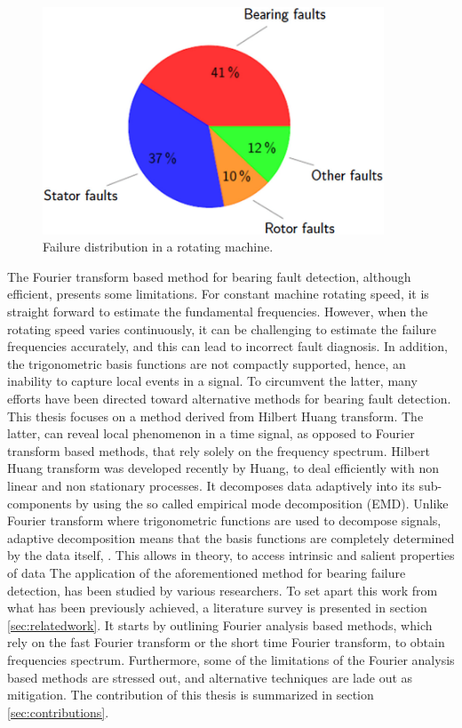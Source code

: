 \documentclass[../Main/thesis.tex]{subfiles}
\begin{document}
\begin{figure}[H] %
   \centering
   \includegraphics[width=4in]{../fig/pie.png} 
   \caption{Failure distribution in a rotating machine. }
   \label{fig:pie}
\end{figure}
\justify
The Fourier transform based method for bearing fault detection, although efficient, presents some limitations.
 For constant machine rotating speed, it is straight forward to estimate the fundamental frequencies. However, when the rotating speed varies continuously, it can be challenging to estimate the failure frequencies accurately, and this can lead to incorrect fault diagnosis. In addition, the trigonometric basis functions are not compactly supported, hence, an inability to capture local events in a signal.
\justify
To circumvent the latter, many efforts have been directed toward alternative methods for bearing fault detection. This thesis focuses on a method derived from Hilbert Huang transform. The latter, can reveal local phenomenon in a time signal, as opposed to Fourier transform based methods, that rely solely on the frequency spectrum.
\justify
Hilbert Huang transform was developed recently by  Huang, \cite{huang98} to deal efficiently with non linear and non stationary processes. It decomposes data adaptively 
into its sub-components by using the so called empirical mode decomposition (EMD). Unlike Fourier transform where trigonometric functions are used to decompose signals, adaptive decomposition means that 
the basis functions are completely determined by the data itself, \cite{huang08}. This allows in theory, to access intrinsic and salient properties of data
\justify
 The application of the aforementioned method for bearing failure detection, has been studied by various researchers. 
To set apart this work from what has been previously achieved, a literature survey is presented in section \ref{sec:relatedwork}. It starts by outlining Fourier analysis based methods, which rely on the fast Fourier transform or the short time Fourier transform, to obtain frequencies spectrum. Furthermore, some of the limitations of the Fourier analysis based methods are stressed out, and alternative techniques are lade out as mitigation. The contribution of this thesis is summarized in section \ref{sec:contributions}.
\end{document}
